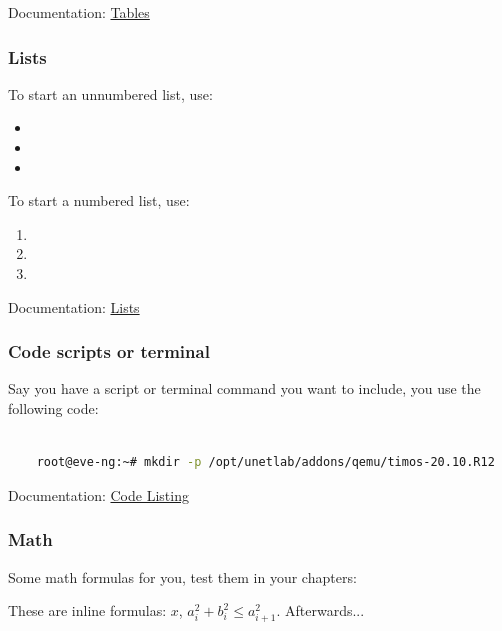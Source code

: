 Documentation: \href{https://www.overleaf.com/learn/latex/Tables}{Tables}


\subsubsection{Lists}

To start an unnumbered list, use:

\begin{itemize}
    \item 
    \item 
    \item 
\end{itemize}

To start a numbered list, use:

\begin{enumerate}
    \item 
    \item 
    \item 
\end{enumerate}



Documentation: \href{https://www.overleaf.com/learn/latex/Lists}{Lists}


\subsubsection{Code scripts or terminal}

Say you have a script or terminal command you want to include, you use the following code:

    \lstset{style=mystyle} %
    
    \begin{lstlisting}[language=bash, caption= Code caption]
    
    root@eve-ng:~# mkdir -p /opt/unetlab/addons/qemu/timos-20.10.R12

    \end{lstlisting}


Documentation: \href{https://www.overleaf.com/learn/latex/Code_listing}{Code Listing}

\subsubsection{Math}

Some math formulas for you, test them in your chapters:

These are inline formulas: $x$, $a_i^2 + b_i^2 \le a_{i+1}^2$. Afterwards...

